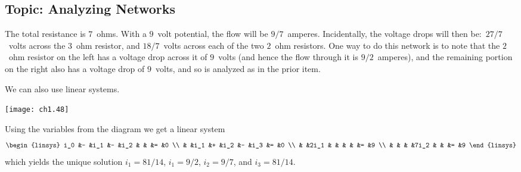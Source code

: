 \subsection{Topic: Analyzing Networks}
\begin{ans}{1}
      \begin{exparts}
        \partsitem The total resistance is $7$~ohms.
          With a $9$~volt potential, the flow will be $9/7$~amperes.
          Incidentally, the voltage drops will then be:~$27/7$~volts
          across the $3$~ohm resistor, and $18/7$~volts across each of
          the two $2$~ohm resistors.
        \partsitem One way to do this network is to note that the $2$~ohm
          resistor on the left has a voltage drop across it of $9$~volts
          (and hence the flow through it is $9/2$~amperes), and the
          remaining portion on the right also has a voltage drop of
          $9$~volts, and so is analyzed as in the prior item.

          We can also use linear systems.
          \begin{center}
            \texttt{[image: ch1.48]}
          \end{center}
          Using the variables from the diagram we get a linear system
          \begin{equation*}
            \begin{linsys}{4}
              i_0  &- &i_1  &- &i_2  &  &    &= &0  \\
                   &  &i_1  &+ &i_2  &- &i_3 &= &0  \\
                   &  &2i_1 &  &     &  &    &= &9  \\
                   &  &     &  &7i_2 &  &    &= &9
            \end{linsys}
          \end{equation*}
          which yields the unique solution $i_1=81/14$, $i_1=9/2$, $i_2=9/7$,
          and $i_3=81/14$.


\end{exparts}
\end{ans}
